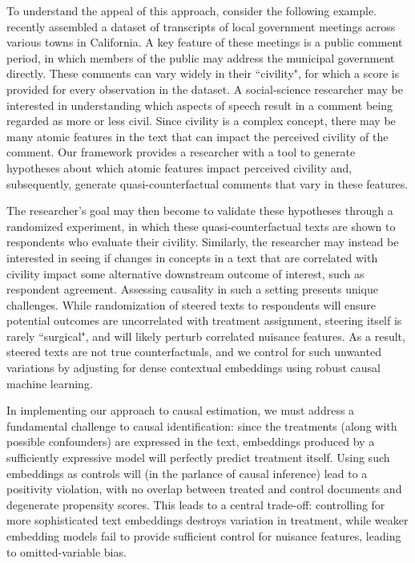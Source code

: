 \documentclass{article}
\theoremstyle{plain}
\theoremstyle{definition}
\theoremstyle{remark}
\begin{document}
To understand the appeal of this approach, consider the following example. \citet{martinvenugopal} recently assembled a dataset of transcripts of local government meetings across various towns in California. A key feature of these meetings is a public comment period, in which members of the public may address the municipal government directly. These comments can vary widely in their ``civility", for which a score is provided for every observation in the dataset. A social-science researcher may be interested in understanding which aspects of speech result in a comment being regarded as more or less civil. Since civility is a complex concept, there may be many atomic features in the text that can impact the perceived civility of the comment. Our framework provides a researcher with a tool to generate hypotheses about which atomic features impact perceived civility and, subsequently, generate quasi-counterfactual comments that vary in these features. 

The researcher's goal may then become to validate these hypotheses through a randomized experiment, in which these quasi-counterfactual texts are shown to respondents who evaluate their civility. Similarly, the researcher may instead be interested in seeing if changes in concepts in a text that are correlated with civility impact some alternative downstream outcome of interest, such as respondent agreement. Assessing causality in such a setting presents unique challenges. While randomization of steered texts to respondents will ensure potential outcomes are uncorrelated with treatment assignment, steering itself is rarely ``surgical", and will likely perturb correlated nuisance features. As a result, steered texts are not true counterfactuals, and we control for such unwanted variations by adjusting for dense contextual embeddings using robust causal machine learning.

In implementing our approach to causal estimation, we must address a fundamental challenge to causal identification: since the treatments (along with possible confounders) are expressed in the text, embeddings produced by a sufficiently expressive model will perfectly predict treatment itself. Using such embeddings as controls will (in the parlance of causal inference) lead to a positivity violation, with no overlap between treated and control documents and degenerate propensity scores. This leads to a central trade-off: controlling for more sophisticated text embeddings destroys variation in treatment, while weaker embedding models fail to provide sufficient control for nuisance features, leading to omitted-variable bias.
\end{document}
